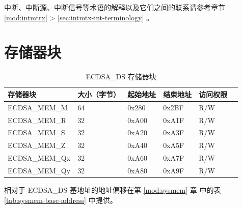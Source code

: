 \documentclass[main\_\_CN.tex]{subfiles}
\begin{document}
\begin{tiplisting}
中断、中断源、中断信号等术语的解释以及它们之间的联系请参考章节 \ref{mod:intmtrx} \textit{} > \ref{sec:intmtx-int-terminology} \textit{}。
\end{tiplisting}


\section{存储器块}


\begin{table}[H]
    \centering
    \caption{ECDSA\_DS 存储器块} \label{tab:ecdsa-memory}
    \begin{threeparttable}
    \begin{tabular}{ | l | l | l | l | l | l | }
    \hline
        \rowcolor{lightgray}
        \textbf{存储器块} & \textbf{大小（字节）}  &  \textbf{起始地址}\tnote{*} &  \textbf{结束地址} \tnote{*} & \textbf{访问权限}   \\ \hline
        ECDSA\_MEM\_M    & 64  & 0x280 & 0x2BF & R/W \\ \hline
        ECDSA\_MEM\_R    & 32  & 0xA00 & 0xA1F & R/W \\ \hline
        ECDSA\_MEM\_S    & 32  & 0xA20 & 0xA3F & R/W \\ \hline
        ECDSA\_MEM\_Z    & 32  & 0xA40 & 0xA5F & R/W \\ \hline
        ECDSA\_MEM\_Qx   & 32  & 0xA60 & 0xA7F & R/W \\ \hline
        ECDSA\_MEM\_Qy   & 32  & 0xA80 & 0xA9F & R/W \\ \hline
    \end{tabular}
    \begin{tablenotes}
        \item[*] 相对于 ECDSA\_DS 基地址的地址偏移在第 \ref{mod:sysmem} 章\textit{} 中的表 \ref{tab:sysmem-base-address} 中提供。
    \end{tablenotes}
    \end{threeparttable}
\end{table}



\end{document}
